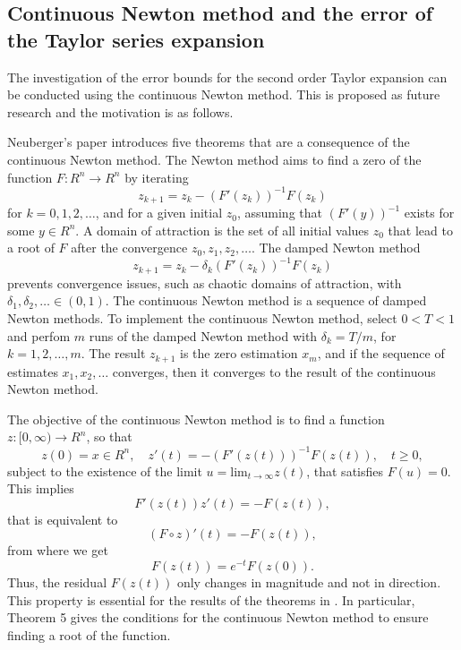 \color{blue}
\subsection*{Continuous Newton method and the error of the Taylor series expansion}

The investigation of the error bounds for the second order Taylor expansion can be conducted using the continuous Newton method. 
This is proposed as future research and the motivation is as follows. 
	
Neuberger's paper \cite{Neuberger07} introduces five theorems that are a consequence of the continuous Newton method.
The Newton method aims to find a zero of the function $F: R^n \rightarrow R^n$ by iterating
\begin{equation} z_{k+1} = z_k - \left(F' (z_k) \right)^{-1} F(z_k) \end{equation}
for $k=0,1,2,\ldots$, and for a given initial $z_0$, assuming that $\left(F' (y) \right)^{-1}$ exists for some $y \in R^n$.
A domain of attraction is the set of all initial values $z_0$ that lead to a root of $F$ after the convergence $z_0, z_1, z_2,\ldots$.
The damped Newton method  
\begin{equation} z_{k+1} = z_k - \delta_k \left(F' (z_k) \right)^{-1} F(z_k) \end{equation}
prevents convergence issues, such as chaotic domains of attraction, with $\delta_1, \delta_2, \ldots \in (0, 1)$. 
The continuous Newton method is a sequence of damped Newton methods. 
To implement the continuous Newton method, select $0<T<1$ and perfom $m$ runs of the damped Newton method with $\delta_k = T/m$, for $k=1,2,\ldots, m$.
The result $z_{k+1}$ is the zero estimation $x_m$, and if the sequence of estimates $x_1, x_2, \ldots$ converges, then it converges to the result of the continuous Newton method.
	
The objective of the continuous Newton method is to find a function $z: [0, \infty) \rightarrow R^n$, so that
\begin{equation} z(0) = x \in R^n, \quad z' (t) = - \left(F' (z(t)) \right)^{-1} F(z(t)), \quad t \geq 0, \label{eqn:contNewton}\end{equation}
subject to the existence of the limit $u=\mathrm{lim}_{t \rightarrow \infty}{z(t)}$, that satisfies $F(u)=0$.
This implies 
\begin{equation}  F' (z(t)) z' (t) = - F(z(t)) , \end{equation}
that is equivalent to
\begin{equation}  \left(F \circ z\right)' (t) = - F(z(t)) , \end{equation}
from where we get
\begin{equation}  F(z(t)) = e^{-t} F(z(0)) . \end{equation}
Thus, the residual $F(z(t))$ only changes in magnitude and not in direction.
This property is essential for the results of the theorems in \cite{Neuberger07}. 
In particular, Theorem 5 gives the conditions for the continuous Newton method to ensure finding a root of the function.
    
